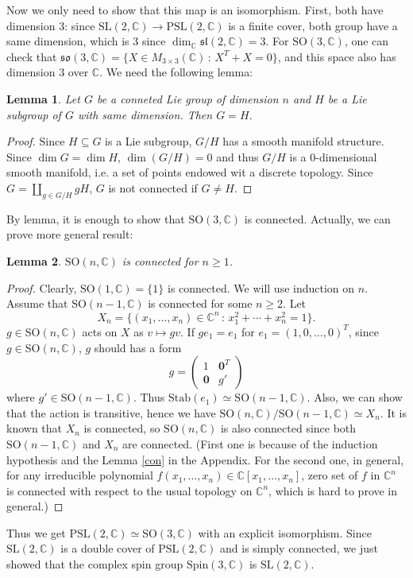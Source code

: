 \documentclass{article}
\newtheorem{lemma}{Lemma}
\newcommand{\PSL}{\mathrm{PSL}}
\newcommand{\SO}{\mathrm{SO}}
\newcommand{\SL}{\mathrm{SL}}
\newcommand{\Spin}{\mathrm{Spin}}
\begin{document}
Now we only need to show that this map is an isomorphism. First, both have dimension 3: since $\SL(2, \mathbb{C})\to \PSL(2, \mathbb{C})$ is a finite cover, both group have a same dimension, which is 3 since $\dim_{\mathbb{C}} \mathfrak{sl}(2, \mathbb{C}) = 3$. 
For $\SO(3, \mathbb{C})$, one can check that $\mathfrak{so}(3, \mathbb{C}) = \{X\in M_{3\times 3}(\mathbb{C})\,:\, X^{T}+X = 0\}$, and this space also has dimension 3 over $\mathbb{C}$. 
We need the following lemma:
\begin{lemma}
Let $G$ be a conneted Lie group of dimension $n$ and $H$ be a Lie subgroup of $G$ with same dimension. 
Then $G = H$. 
\end{lemma}
\begin{proof}
Since $H\subseteq G$ is a Lie subgroup, $G/H$ has a smooth manifold structure. Since $\dim G = \dim H$, $\dim (G/H) = 0$ and thus $G/H$ is a $0$-dimensional smooth manifold, i.e. a set of points endowed wit a discrete topology. 
Since $G = \coprod_{g\in G/H} gH$, $G$ is not connected if $G\neq H$. 
\end{proof}
By lemma, it is enough to show that $\SO(3, \mathbb{C})$ is connected. Actually, we can prove more general result:
\begin{lemma}
$\SO(n, \mathbb{C})$ is connected for $n\geq 1$. 
\end{lemma}
\begin{proof}
Clearly, $\SO(1, \mathbb{C}) = \{1\}$ is connected. We will use induction on $n$. Assume that $\SO(n-1, \mathbb{C})$ is connected for some $n\geq 2$. Let 
$$
X_n = \{(x_{1}, \dots, x_{n})\in \mathbb{C}^{n}\,:\, x_{1}^{2} + \cdots + x_{n}^{2}= 1\}. 
$$
$g\in \SO(n, \mathbb{C})$ acts on $X$ as $v\mapsto gv$. 
If $ge_{1} = e_{1}$ for $e_{1} = (1, 0, \dots, 0)^{T}$, since $g\in \SO(n, \mathbb{C})$, $g$ should has a form 
$$
g = \begin{pmatrix} 1 & \mathbf{0}^{T} \\ \mathbf{0} & g'\end{pmatrix}
$$
where $g'\in \SO(n-1, \mathbb{C})$. Thus $\mathrm{Stab}(e_{1})\simeq \SO(n-1, \mathbb{C})$. 
Also, we can show that the action is transitive, hence we have $\SO(n, \mathbb{C})/\SO(n-1, \mathbb{C})\simeq X_{n}$. 
It is known that $X_{n}$ is connected, so $\SO(n, \mathbb{C})$ is also connected since both $\SO(n-1, \mathbb{C})$ and $X_{n}$ are connected.  (First one is because of the induction hypothesis and the Lemma \ref{con} in the Appendix. For the second one, in general, for any irreducible polynomial $f(x_{1}, \dots, x_{n})\in \mathbb{C}[x_{1}, \dots, x_{n}]$, zero set of $f$ in $\mathbb{C}^{n}$ is connected with respect to the usual topology on $\mathbb{C}^{n}$, which is hard to prove in general.)
\end{proof}
Thus we get $\PSL(2, \mathbb{C})\simeq \SO(3, \mathbb{C})$ with an explicit isomorphism. 
Since $\SL(2, \mathbb{C})$ is a double cover of $\PSL(2, \mathbb{C})$ and is simply connected, we just showed that the complex spin group $\Spin(3, \mathbb{C})$ is $\SL(2, \mathbb{C})$. 
\end{document}
